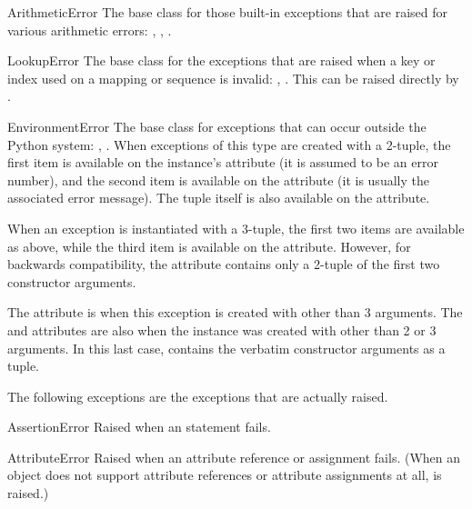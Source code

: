 \begin{excdesc}{ArithmeticError}
The base class for those built-in exceptions that are raised for
various arithmetic errors: ,
, .
\end{excdesc}

\begin{excdesc}{LookupError}
The base class for the exceptions that are raised when a key or
index used on a mapping or sequence is invalid: ,
.  This can be raised directly by
.
\end{excdesc}

\begin{excdesc}{EnvironmentError}
The base class for exceptions that
can occur outside the Python system: ,
.  When exceptions of this type are created with a
2-tuple, the first item is available on the instance's 
attribute (it is assumed to be an error number), and the second item
is available on the  attribute (it is usually the
associated error message).  The tuple itself is also available on the
 attribute.

When an  exception is instantiated with a
3-tuple, the first two items are available as above, while the third
item is available on the  attribute.  However, for
backwards compatibility, the  attribute contains only a
2-tuple of the first two constructor arguments.

The  attribute is  when this exception is
created with other than 3 arguments.  The  and
 attributes are also  when the instance was
created with other than 2 or 3 arguments.  In this last case,
 contains the verbatim constructor arguments as a tuple.
\end{excdesc}



The following exceptions are the exceptions that are actually raised.

\begin{excdesc}{AssertionError}
Raised when an  statement fails.
\end{excdesc}

\begin{excdesc}{AttributeError}
  Raised when an attribute reference or assignment fails.  (When an
  object does not support attribute references or attribute assignments
  at all,  is raised.)
\end{excdesc}

